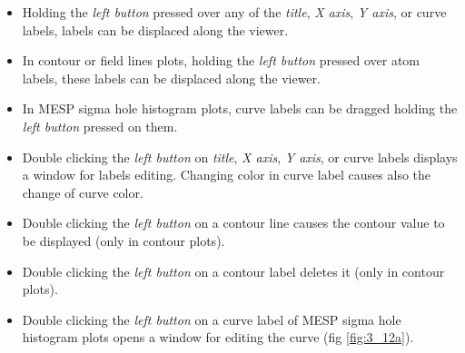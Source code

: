 \documentclass[10pt]{article}
\begin{document}
\begin{itemize}
\item Holding the {\it left button} pressed over any of the {\it title},
{\it X axis}, {\it Y axis}, or curve labels, labels can be displaced
along the viewer.

\item In contour or field lines plots, holding the {\it left button} pressed over
atom labels, these labels can be displaced along the viewer.

\item In MESP sigma hole histogram plots, curve labels can be dragged holding the {\it left button} pressed on them.

\item Double clicking the  {\it left button} on {\it title}, {\it X axis}, {\it
Y axis}, or curve labels displays a window for labels editing. Changing color
in curve label causes also the change of curve color.

\item Double clicking the  {\it left button} on a contour line causes the
contour value to be displayed (only in contour plots). 

\item Double clicking the  {\it left button} on a contour label deletes it  (only in 
contour plots).

\item Double clicking the  {\it left button} on a curve label of MESP sigma hole histogram plots opens a window for editing the curve (fig \ref{fig:3_12a}).


\end{itemize}
\end{document}
